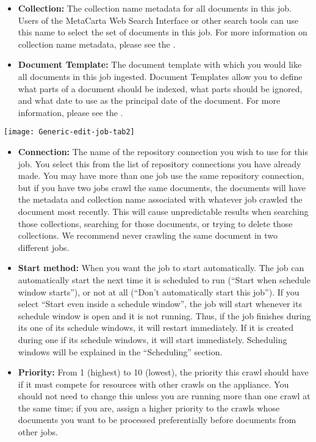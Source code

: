 \begin{changemargin}{1.5in}{0in}
\begin{itemize}
\item \textbf{Collection:} The collection name metadata for all
documents in this job. Users of the MetaCarta Web Search Interface or
other search tools can use this name to select the set of documents in
this job. For more information on collection name metadata, please see
the .

\item \textbf{Document Template:} The document template with which you
would like all documents in this job ingested.  Document Templates allow
you to define what parts of a document should be indexed, what parts
should be ignored, and what date to use as the principal date of the
document. For more information, please see the .


\end{itemize}

\texttt{[image: Generic-edit-job-tab2]}

\begin{itemize}

\item \textbf{Connection:} The name of the repository connection you
wish to use for this job. You select this from the list of repository
connections you have already made. You may have more than one job use
the same repository connection, but if you have two jobs crawl the same
documents, the documents will have the metadata and collection name
associated with whatever job crawled the document most recently. This
will cause unpredictable results when searching those collections,
searching for those documents, or trying to delete those collections.
We recommend never crawling the same document in two different jobs.

\item \textbf{Start method:} When you want the job to start
automatically. The job can automatically start the next time it is
scheduled to run (``Start when schedule window starts''), or not at
all (``Don't automatically start this job''). If you select ``Start
even inside a schedule window'', the job will start whenever its
schedule window is open and it is not running. Thus, if the job
finishes during its one of its schedule windows, it will restart
immediately. If it is created during one if its schedule windows, it
will start immediately. Scheduling windows will be explained in the
``Scheduling'' section.

\item \textbf{Priority:} From 1 (highest) to 10 (lowest), the priority
this crawl should have if it must compete for resources with other
crawls on the appliance. You should not need to change this unless you
are running more than one crawl at the same time; if you are, assign a
higher priority to the crawls whose documents you want to be processed
preferentially before documents from other jobs.


\end{itemize}
\end{changemargin}
